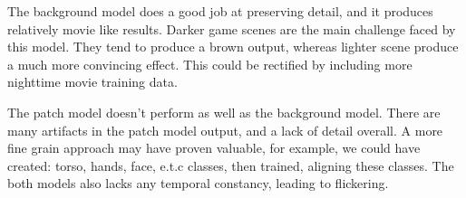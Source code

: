 The background model does a good job at preserving detail, and it produces relatively movie like results.
Darker game scenes are the main challenge faced by this model.
They tend to produce a brown output, whereas lighter scene produce a much more convincing effect.
This could be rectified by including more nighttime movie training data.

The patch model doesn't perform as well as the background model.
There are many artifacts in the patch model output, and a lack of detail overall.
A more fine grain approach may have proven valuable, for example, we could have created: torso, hands, face, e.t.c classes, then trained, aligning these classes.
The both models also lacks any temporal constancy, leading to flickering.